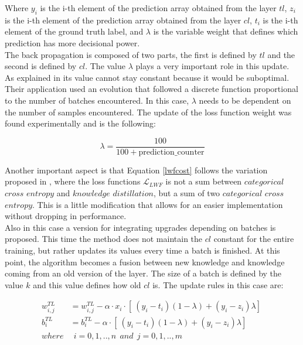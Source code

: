 \documentclass[12pt]{report}
\begin{document}
Where $y_i$ is the i-th element of the prediction array obtained from the layer $tl$, $z_i$ is the i-th element of the prediction array obtained from the layer $cl$, $t_i$ is the i-th element of the ground truth label, and $\lambda$ is the variable weight that defines which prediction has more decisional power.\\
The back propagation is composed of two parts, the first is defined by $tl$ and the second is defined by $cl$. The value $\lambda$ plays a very important role in this update. As explained in \autocite{maltoni2019continuous} its value cannot stay constant because it would be suboptimal. Their application used an evolution that followed a discrete function proportional to the number of batches encountered. In this case, $\lambda$ needs to be dependent on the number of samples encountered. The update of the loss function weight was found experimentally and is the following:

\begin{equation}
	\lambda = \frac{100}{100+ \text{prediction$\_$counter}}
\end{equation}

Another important aspect is that Equation \ref{lwfcost} follows the variation proposed in \autocite{maltoni2019continuous}, where the loss functions $\mathcal{L}_{LWF}$ is not a sum between $categorical$ $cross$ $entropy$ and $knowledge$ $distillation$, but a sum of two $categorical$ $cross$ $entropy$. This is a little modification that allows for an easier implementation without dropping in performance. \\
Also in this case a version for integrating upgrades depending on batches is proposed. This time the method does not maintain the $cl$ constant for the entire training, but rather updates its values every time a batch is finished. At this point, the algorithm becomes a fusion between new knowledge and knowledge coming from an old version of the layer. The size of a batch is defined by the value $k$ and this value defines how old $cl$ is. The update rules in this case are:

\begin{align}
	w^{TL}_{i,j} &= w^{TL}_{i,j} - \alpha \cdot x_i \cdot [\ (y_i - t_i)(1-\lambda) + (y_i - z_i)\lambda ]\ \\
	b^{TL}_i     &= b^{TL}_i - \alpha \cdot [\ (y_i - t_i)(1-\lambda) + (y_i - z_i)\lambda ]\ \\
	where        & \: \: i= 0,1,..,n  \: \: and \: \:  j=0,1,..,m \nonumber  
\end{align} 
\end{document}
